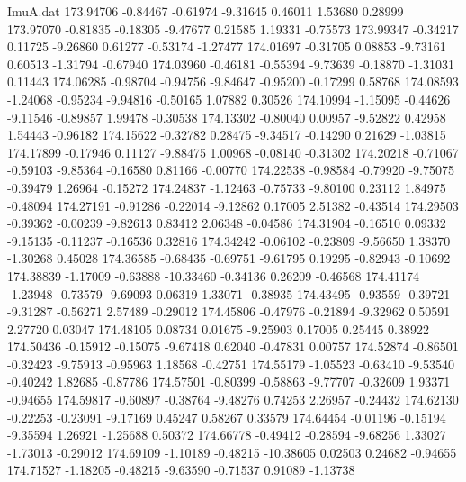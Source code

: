 \begin{filecontents}{ImuA.dat}
 173.94706   -0.84467   -0.61974   -9.31645    0.46011    1.53680    0.28999
 173.97070   -0.81835   -0.18305   -9.47677    0.21585    1.19331   -0.75573
 173.99347   -0.34217    0.11725   -9.26860    0.61277   -0.53174   -1.27477
 174.01697   -0.31705    0.08853   -9.73161    0.60513   -1.31794   -0.67940
 174.03960   -0.46181   -0.55394   -9.73639   -0.18870   -1.31031    0.11443
 174.06285   -0.98704   -0.94756   -9.84647   -0.95200   -0.17299    0.58768
 174.08593   -1.24068   -0.95234   -9.94816   -0.50165    1.07882    0.30526
 174.10994   -1.15095   -0.44626   -9.11546   -0.89857    1.99478   -0.30538
 174.13302   -0.80040    0.00957   -9.52822    0.42958    1.54443   -0.96182
 174.15622   -0.32782    0.28475   -9.34517   -0.14290    0.21629   -1.03815
 174.17899   -0.17946    0.11127   -9.88475    1.00968   -0.08140   -0.31302
 174.20218   -0.71067   -0.59103   -9.85364   -0.16580    0.81166   -0.00770
 174.22538   -0.98584   -0.79920   -9.75075   -0.39479    1.26964   -0.15272
 174.24837   -1.12463   -0.75733   -9.80100    0.23112    1.84975   -0.48094
 174.27191   -0.91286   -0.22014   -9.12862    0.17005    2.51382   -0.43514
 174.29503   -0.39362   -0.00239   -9.82613    0.83412    2.06348   -0.04586
 174.31904   -0.16510    0.09332   -9.15135   -0.11237   -0.16536    0.32816
 174.34242   -0.06102   -0.23809   -9.56650    1.38370   -1.30268    0.45028
 174.36585   -0.68435   -0.69751   -9.61795    0.19295   -0.82943   -0.10692
 174.38839   -1.17009   -0.63888  -10.33460   -0.34136    0.26209   -0.46568
 174.41174   -1.23948   -0.73579   -9.69093    0.06319    1.33071   -0.38935
 174.43495   -0.93559   -0.39721   -9.31287   -0.56271    2.57489   -0.29012
 174.45806   -0.47976   -0.21894   -9.32962    0.50591    2.27720    0.03047
 174.48105    0.08734    0.01675   -9.25903    0.17005    0.25445    0.38922
 174.50436   -0.15912   -0.15075   -9.67418    0.62040   -0.47831    0.00757
 174.52874   -0.86501   -0.32423   -9.75913   -0.95963    1.18568   -0.42751
 174.55179   -1.05523   -0.63410   -9.53540   -0.40242    1.82685   -0.87786
 174.57501   -0.80399   -0.58863   -9.77707   -0.32609    1.93371   -0.94655
 174.59817   -0.60897   -0.38764   -9.48276    0.74253    2.26957   -0.24432
 174.62130   -0.22253   -0.23091   -9.17169    0.45247    0.58267    0.33579
 174.64454   -0.01196   -0.15194   -9.35594    1.26921   -1.25688    0.50372
 174.66778   -0.49412   -0.28594   -9.68256    1.33027   -1.73013   -0.29012
 174.69109   -1.10189   -0.48215  -10.38605    0.02503    0.24682   -0.94655
 174.71527   -1.18205   -0.48215   -9.63590   -0.71537    0.91089   -1.13738

\end{filecontents}
